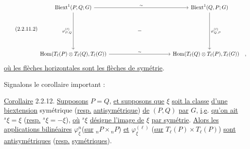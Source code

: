 \begin{equation}\tag{2.2.11.2}
\begin{tikzcd}[row sep=large, column sep=huge]
\mathrm{Biext}^1(P,Q;G) \arrow[rr, "\sim"] \arrow[dd, "{\varphi^{(\ell)}_{P,Q}}"'] & & \mathrm{Biext}^1(Q,P;G) \arrow[dd, "{\varphi^{(\ell)}_{Q,P}}"] \\
& - & \\
\mathrm{Hom}(T_\ell(P)\otimes T_\ell(Q),T_\ell(G)) \arrow[rr, "\sim"] & & \mathrm{Hom}(T_\ell(Q)\otimes T_\ell(P),T_\ell(G)) \quad ,
\end{tikzcd}
\end{equation}
\underline{où les flèches horizontales sont les flèches de symétrie}.

Signalons le corollaire important :

\underline{Corollaire} 2.2.12. \underline{Supposons} $P=Q$, \underline{et supposons que} $\xi$ \underline{soit la classe} \underline{d'une biextension} symétrique (\underline{resp.} \underline{antisymétrique}) \underline{de} $(P,Q)$ \underline{par} $G$, \underline{i}.\underline{e}. \underline{qu'on ait} ${}^s\xi = \xi$ (\underline{resp.} ${}^s\xi = -\xi$), \underline{où} ${}^s\xi$ \underline{désigne l'image de} $\xi$ \underline{par symétrie}. \underline{Alors les applications bilinéaires} $\varphi^n_\xi$(\underline{sur} ${}_nP\times{}_nP$) \underline{et} $\varphi^{(\ell)}_\xi$ (\underline{sur} $T_\ell(P)\times T_\ell(P)$) \underline{sont antisymétriques} (\underline{resp.} \underline{symétriques}).


